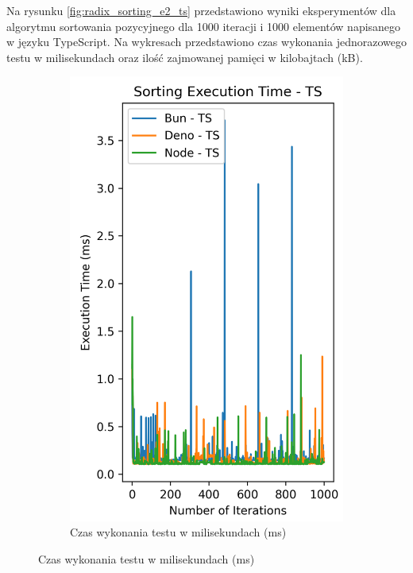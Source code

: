 Na rysunku \ref{fig:radix_sorting_e2_ts} przedstawiono wyniki eksperymentów dla algorytmu sortowania pozycyjnego dla 1000 iteracji i 1000 elementów napisanego w języku TypeScript. Na wykresach przedstawiono czas wykonania jednorazowego testu w milisekundach oraz ilość zajmowanej pamięci w kilobajtach (kB).

\begin{figure}[H]
  \centering
  \begin{subfigure}[b]{0.42\textwidth}
    \centering
    \includegraphics[width=\textwidth]{Figures/sorting/sorting_radix_1000_1000_ts_time.png}
    \caption{Czas wykonania testu w milisekundach (ms)}
    \label{fig:radix_sorting_e2_ts_time}

\end{subfigure}
\end{figure}
